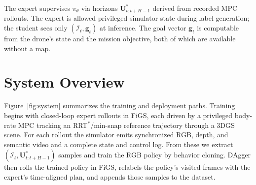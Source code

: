 \documentclass[10pt,twocolumn,letterpaper]{article}
\begin{document}
The expert supervises $\pi_\theta$ via horizons $\mathbf{U}^{*}_{t:t+H-1}$ derived from recorded MPC rollouts. The expert is allowed privileged simulator state during label generation; the student sees only $(\mathcal{I}_t, \mathbf{g}_t)$ at inference. The goal vector $\mathbf{g}_t$ is computable from the drone's state and the mission objective, both of which are available without a map.

\section{System Overview}
\label{sec:overview}

Figure~\ref{fig:system} summarizes the training and deployment paths. Training begins with closed-loop expert rollouts in FiGS, each driven by a privileged body-rate MPC tracking an RRT$^{*}$/min-snap reference trajectory through a 3DGS scene. For each rollout the simulator emits synchronized RGB, depth, and semantic video and a complete state and control log. From these we extract $(\mathcal{I}_t, \mathbf{U}^{*}_{t:t+H-1})$ samples and train the RGB policy by behavior cloning. DAgger then rolls the trained policy in FiGS, relabels the policy's visited frames with the expert's time-aligned plan, and appends those samples to the dataset.
\end{document}
